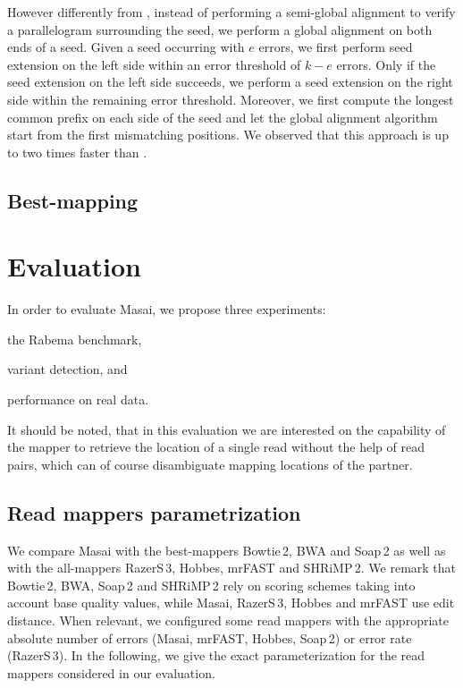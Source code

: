 However differently from \citep{Razers3}, instead of performing a semi-global alignment to verify a parallelogram surrounding the seed, we perform a global alignment on both ends of a seed.
Given a seed occurring with $e$ errors, we first perform seed extension on the left side within an error threshold of $k - e$ errors.
Only if the seed extension on the left side succeeds, we perform a seed extension on the right side within the remaining error threshold.
Moreover, we first compute the longest common prefix on each side of the seed and let the global alignment algorithm start from the first mismatching positions.
We observed that this approach is up to two times faster than \citep{Razers3}.

\subsection{Best-mapping}


\section{Evaluation}

In order to evaluate Masai, we propose three experiments: \begin{inparaenum}[(i)]
\item the Rabema benchmark,
\item variant detection, and
\item performance on real data.
\end{inparaenum}

It should be noted, that in this evaluation we are interested on the capability of the mapper to retrieve the location of a single read without the help of read pairs, which can of course disambiguate mapping locations of the partner.

\subsection{Read mappers parametrization}

We compare Masai with the best-mappers Bowtie\,2, BWA and Soap\,2 as well as with the all-mappers RazerS\,3, Hobbes, mrFAST and SHRiMP\,2.
We remark that Bowtie\,2, BWA, Soap\,2 and SHRiMP\,2 rely on scoring schemes taking into account base quality values, while Masai, RazerS\,3, Hobbes and mrFAST use edit distance.
When relevant, we configured some read mappers with the appropriate absolute number of errors (Masai, mrFAST, Hobbes, Soap\,2) or error rate (RazerS\,3).
In the following, we give the exact parameterization for the read mappers considered in our evaluation.

